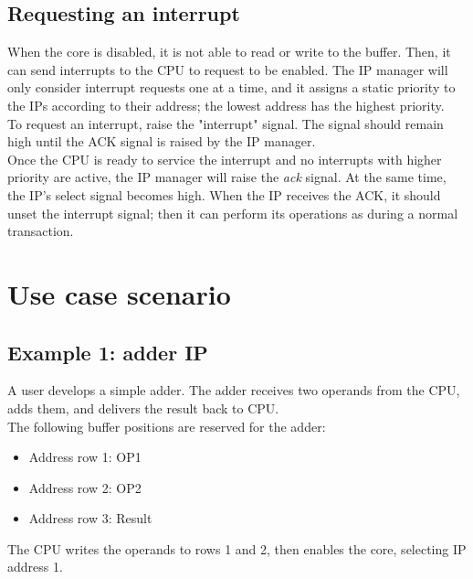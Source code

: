 \subsection{Requesting an interrupt} \label{4.3}
When the core is disabled, it is not able to read or write to the buffer. Then, it can send interrupts to the CPU to request to be enabled. The IP manager will only consider interrupt requests one at a time, and it assigns a static priority to the IPs according to their address; the lowest address has the highest priority. \\
\bigskip
To request an interrupt, raise the "interrupt" signal. The signal should remain high until the ACK signal is raised by the IP manager.\\ 
\bigskip
Once the CPU is ready to service the interrupt and no interrupts with higher priority are active, the IP manager will raise the \textit{ack} signal. At the same time, the IP's select signal becomes high. When the IP receives the ACK, it should unset the interrupt signal; then it can perform its operations as during a normal transaction.




\section{Use case scenario}


\subsection{Example 1: adder IP}

A user develops a simple adder. The adder receives two operands from the CPU, adds them, and delivers the result back to CPU. \\

The following buffer positions are reserved for the adder:
\begin{itemize}
\item Address row 1: OP1 
\item Address row 2: OP2
\item Address row 3: Result
\end{itemize}

The CPU writes the operands to rows 1 and 2, then enables the core, selecting IP address 1.\\

